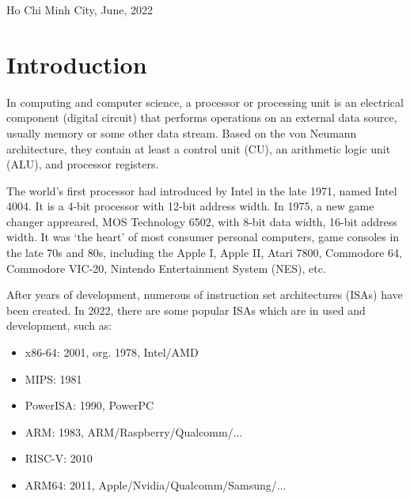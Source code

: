 \documentclass[13pt,a4paper]{report}
\begin{document}
\begin{titlepage}
\begin{otherlanguage}{vietnamese}
\end{otherlanguage}

\vspace{2.25cm}
\begin{center}
{\fontsize{13pt}{1}\selectfont Ho Chi Minh City,  June, 2022}
\end{center}
\end{titlepage}

\tableofcontents


\chapter{Introduction}
In computing and computer science, a processor or processing unit is an electrical component (digital circuit) that performs operations on an external data source, usually memory or some other data stream. Based on the von Neumann architecture, they contain at least a control unit (CU), an arithmetic logic unit (ALU), and processor registers.

The world's first processor had introduced by Intel in the late 1971, named Intel 4004. It is a 4-bit processor with 12-bit address width. In 1975, a new game changer appreared, MOS Technology 6502, with 8-bit data width, 16-bit address width. It was `the heart' of most consumer personal computers, game consoles in the late 70s and 80s, including the Apple I, Apple II, Atari 7800, Commodore 64, Commodore VIC-20, Nintendo Entertainment System (NES), etc.

After years of development, numerous of instruction set architectures (ISAs) have been created. In 2022, there are some popular ISAs which are in used and development, such as:
\begin{itemize}
\item x86-64: 2001, org. 1978, Intel/AMD
\item MIPS: 1981
\item PowerISA: 1990, PowerPC
\item ARM: 1983, ARM/Raspberry/Qualcomm/...
\item RISC-V: 2010
\item ARM64: 2011, Apple/Nvidia/Qualcomm/Samsung/...
\end{itemize}
\end{document}
